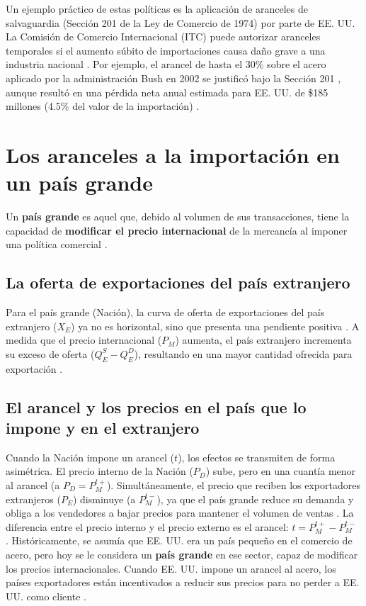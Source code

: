 Un ejemplo práctico de estas políticas es la aplicación de aranceles de salvaguardia (Sección 201 de la Ley de Comercio de 1974) por parte de EE. UU. La Comisión de Comercio Internacional (ITC) puede autorizar aranceles temporales si el aumento súbito de importaciones causa daño grave a una industria nacional . Por ejemplo, el arancel de hasta el 30\% sobre el acero aplicado por la administración Bush en 2002 se justificó bajo la Sección 201 , aunque resultó en una pérdida neta anual estimada para EE. UU. de \$185 millones (4.5\% del valor de la importación) .

\section{Los aranceles a la importación en un país grande}
Un \textbf{país grande} es aquel que, debido al volumen de sus transacciones, tiene la capacidad de \textbf{modificar el precio internacional} de la mercancía al imponer una política comercial .

\subsection{La oferta de exportaciones del país extranjero}
Para el país grande (Nación), la curva de oferta de exportaciones del país extranjero ($X_E$) ya no es horizontal, sino que presenta una pendiente positiva . A medida que el precio internacional ($P_M$) aumenta, el país extranjero incrementa su exceso de oferta ($Q^S_{E} - Q^D_{E}$), resultando en una mayor cantidad ofrecida para exportación .

\subsection{El arancel y los precios en el país que lo impone y en el extranjero}
Cuando la Nación impone un arancel ($t$), los efectos se transmiten de forma asimétrica. El precio interno de la Nación ($P_D$) sube, pero en una cuantía menor al arancel (a $P_D = P_{M}^{t+}$). Simultáneamente, el precio que reciben los exportadores extranjeros ($P_E$) disminuye (a $P_{M}^{t-}$), ya que el país grande reduce su demanda y obliga a los vendedores a bajar precios para mantener el volumen de ventas . La diferencia entre el precio interno y el precio externo es el arancel: $t = P_{M}^{t+} - P_{M}^{t-}$ .
Históricamente, se asumía que EE. UU. era un país pequeño en el comercio de acero, pero hoy se le considera un \textbf{país grande} en ese sector, capaz de modificar los precios internacionales. Cuando EE. UU. impone un arancel al acero, los países exportadores están incentivados a reducir sus precios para no perder a EE. UU. como cliente .

